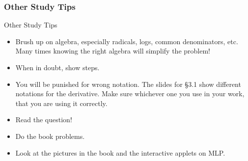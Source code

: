 \documentclass[cal1spr16Lectures.tex]{subfiles}
\begin{document}
\subsubsection{Other Study Tips}

\begin{frame}{\small Other Study Tips}
\footnotesize
\begin{itemize}
\item Brush up on algebra, especially radicals, logs, common denominators, etc.  Many times knowing the right algebra will simplify the problem!
\item When in doubt, show steps.  
\item You will be punished for wrong notation.  The slides for \S 3.1 show different notations for the derivative.  Make sure whichever one you use in your work, that you are using it correctly.
\item Read the question!  
\item Do the book problems.
\item Look at the pictures in the book and the interactive applets on MLP.
\end{itemize}
\end{frame}
\end{document}
